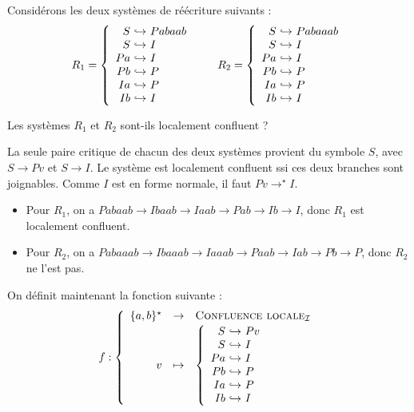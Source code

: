 \begin{exercice}
  Considérons les deux systèmes de réécriture suivants :
  $$
  R_1 =
  \left\{\begin{array}{r@{~\hookrightarrow~}l}
  S & Pabaab\\
  S & I     \\
  P a & I   \\
  P b & P   \\
  I a & P   \\
  I b & I
  \end{array}\right.
  \quad\quad
  R_2 =
  \left\{\begin{array}{r@{~\hookrightarrow~}l}
  S & Pabaaab\\
  S & I     \\
  P a & I   \\
  P b & P   \\
  I a & P   \\
  I b & I
  \end{array}\right.
  $$
  \begin{questions}
  \item Les systèmes $R_1$ et $R_2$ sont-ils localement confluent ?
  \end{questions}
  \begin{corrections}
    La seule paire critique de chacun des deux systèmes provient du symbole $S$, avec
    $S \to Pv$ et  $S \to I$.
    Le système est localement confluent ssi ces deux branches sont joignables. Comme $I$ est en forme normale,
    il faut $Pv\to^\star I$.
    
    \begin{itemize}
    \item Pour $R_1$, on a $Pabaab \rightarrow Ibaab \rightarrow Iaab \rightarrow Pab \rightarrow Ib \rightarrow I$, donc $R_1$ est localement confluent.
    \item Pour $R_2$, on a $Pabaaab \rightarrow Ibaaab \rightarrow Iaaab \rightarrow Paab \rightarrow Iab \rightarrow Pb \rightarrow P$,
      donc $R_2$ ne l'est pas.
    \end{itemize}
  \end{corrections}

  On définit maintenant la fonction suivante :
  $$
  f : \left\{
  \begin{array}{rcl}
    \{a,b\}^\star &\to& \textsc{Confluence locale}_{\mathcal{I}}\\[0.2em]
    v &\mapsto&
    \left\{
    \begin{array}{r@{~\hookrightarrow~}l}
      S & P v \\
      S & I   \\
      P a & I \\
      P b & P \\
      I a & P \\
      I b & I
    \end{array}
    \right.
  \end{array}\right.
  $$


\end{exercice}
